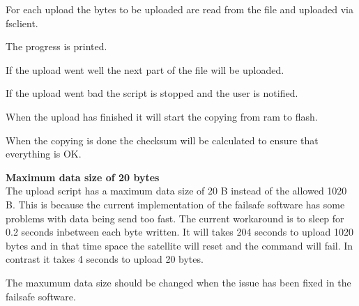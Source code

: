 For each upload the bytes to be uploaded are read from the file and uploaded via fsclient.

The progress is printed.

If the upload went well the next part of the file will be uploaded.

If the upload went bad the script is stopped and the user is notified.

When the upload has finished it will start the copying from ram to flash.

When the copying is done the checksum will be calculated to ensure that everything is OK.

\textbf{Maximum data size of 20 bytes} \\
The upload script has a maximum data size of 20 B instead of the allowed 1020 B. This is because the current implementation of the failsafe software has some problems with data being send too fast. The current workaround is to sleep for 0.2 seconds inbetween each byte written. It will takes 204 seconds to upload 1020 bytes and in that time space the satellite will reset and the command will fail. In contrast it takes 4 seconds to upload 20 bytes.

The maxumum data size should be changed when the issue has been fixed in the failsafe software.
